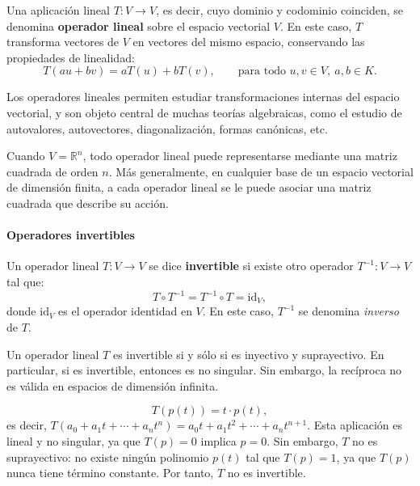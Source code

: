 Una aplicación lineal \(T: V \rightarrow V\), es decir, cuyo dominio y codominio coinciden, se denomina \textbf{operador lineal} sobre el espacio vectorial \(V\). En este caso, \(T\) transforma vectores de \(V\) en vectores del mismo espacio, conservando las propiedades de linealidad:
\[
  T(a u + b v) = a T(u) + b T(v), \qquad \text{para todo } u, v \in V,~ a, b \in K.
\]

Los operadores lineales permiten estudiar transformaciones internas del espacio vectorial, y son objeto central de muchas teorías algebraicas, como el estudio de autovalores, autovectores, diagonalización, formas canónicas, etc.

Cuando \(V = \mathbb{R}^n\), todo operador lineal puede representarse mediante una matriz cuadrada de orden \(n\). Más generalmente, en cualquier base de un espacio vectorial de dimensión finita, a cada operador lineal se le puede asociar una matriz cuadrada que describe su acción.


\paragraph{Operadores invertibles}

Un operador lineal \(T: V \rightarrow V\) se dice \textbf{invertible} si existe otro operador \(T^{-1}: V \rightarrow V\) tal que:
\[
  T \circ T^{-1} = T^{-1} \circ T = \text{id}_V,
\]
donde \(\text{id}_V\) es el operador identidad en \(V\). En este caso, \(T^{-1}\) se denomina \textit{inverso} de \(T\).

\begin{tcolorbox}[title=Observación]
  Un operador lineal \(T\) es invertible si y sólo si es inyectivo y suprayectivo. En particular, si es invertible, entonces es no singular. Sin embargo, la recíproca no es válida en espacios de dimensión infinita.
\end{tcolorbox}

\[
  T(p(t)) = t \cdot p(t),
\]
es decir, \(T(a_0 + a_1t + \cdots + a_n t^n) = a_0t + a_1 t^2 + \cdots + a_n t^{n+1}\). Esta aplicación es lineal y no singular, ya que \(T(p) = 0\) implica \(p = 0\). Sin embargo, \(T\) no es suprayectivo: no existe ningún polinomio \(p(t)\) tal que \(T(p) = 1\), ya que \(T(p)\) nunca tiene término constante. Por tanto, \(T\) no es invertible.

